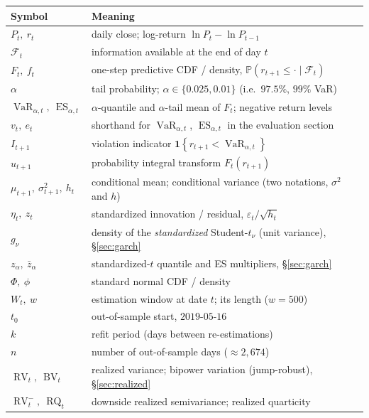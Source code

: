\documentclass[11pt,a4paper]{article}
\newcommand{\Prob}{\mathbb{P}}
\newcommand{\Ind}[1]{\mathbf{1}\!\left\{#1\right\}}
\newcommand{\VaR}{\operatorname{VaR}}
\newcommand{\ES}{\operatorname{ES}}
\newcommand{\RV}{\operatorname{RV}}
\newcommand{\BV}{\operatorname{BV}}
\newcommand{\RQ}{\operatorname{RQ}}
\newcommand{\Fcal}{\mathcal{F}}
\begin{document}
\begin{center}\small
\begin{tabular}{@{}ll@{}}
\toprule
Symbol & Meaning \\
\midrule
$P_t,\ r_t$              & daily close; log-return $\ln P_t-\ln P_{t-1}$ \\
$\Fcal_t$                & information available at the end of day $t$ \\
$F_t,\ f_t$              & one-step predictive CDF / density, $\Prob(r_{t+1}\le\cdot\mid\Fcal_t)$ \\
$\alpha$                 & tail probability; $\alpha\in\{0.025,0.01\}$ (i.e.\ $97.5\%$, $99\%$ VaR) \\
$\VaR_{\alpha,t},\ \ES_{\alpha,t}$ & $\alpha$-quantile and $\alpha$-tail mean of $F_t$; negative return levels \\
$v_t,\ e_t$              & shorthand for $\VaR_{\alpha,t}$, $\ES_{\alpha,t}$ in the evaluation section \\
$I_{t+1}$                & violation indicator $\Ind{r_{t+1}<\VaR_{\alpha,t}}$ \\
$u_{t+1}$                & probability integral transform $F_t(r_{t+1})$ \\
$\mu_{t+1},\ \sigma_{t+1}^2,\ h_t$ & conditional mean; conditional variance (two notations, $\sigma^2$ and $h$) \\
$\eta_t,\ z_t$           & standardized innovation / residual, $\varepsilon_t/\sqrt{h_t}$ \\
$g_\nu$                  & density of the \emph{standardized} Student-$t_\nu$ (unit variance), \S\ref{sec:garch} \\
$z_\alpha,\ \bar z_\alpha$ & standardized-$t$ quantile and ES multipliers, \S\ref{sec:garch} \\
$\Phi,\ \phi$            & standard normal CDF / density \\
$W_t,\ w$               & estimation window at date $t$; its length ($w=500$) \\
$t_0$                    & out-of-sample start, $2019$-$05$-$16$ \\
$k$                      & refit period (days between re-estimations) \\
$n$                      & number of out-of-sample days ($\approx 2{,}674$) \\
$\RV_t,\ \BV_t$          & realized variance; bipower variation (jump-robust), \S\ref{sec:realized} \\
$\RV^{-}_t,\ \RQ_t$      & downside realized semivariance; realized quarticity \\

\end{tabular}
\end{center}
\end{document}
